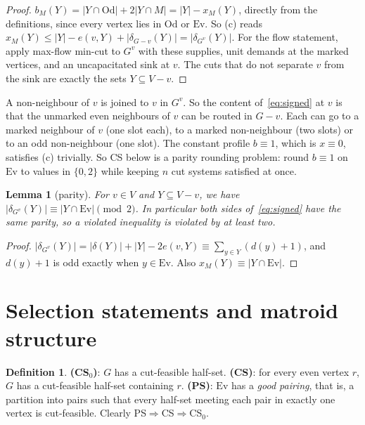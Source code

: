 \documentclass[11pt]{amsart}
\newtheorem{lemma}[theorem]{Lemma}
\theoremstyle{definition}
\newtheorem{definition}[theorem]{Definition}
\newcommand{\Ev}{\mathrm{Ev}}
\newcommand{\Od}{\mathrm{Od}}
\begin{document}
\begin{proof}
$b_M(Y)=|Y\cap\Od|+2|Y\cap M|=|Y|-x_M(Y)$, directly from the definitions, since every vertex lies
in $\Od$ or $\Ev$. So (c) reads
$x_M(Y)\le |Y|-e(v,Y)+|\delta_{G-v}(Y)|=|\delta_{G^v}(Y)|$. For the flow statement, apply max-flow
min-cut to $G^v$ with these supplies, unit demands at the marked vertices, and an uncapacitated sink
at $v$. The cuts that do not separate $v$ from the sink are exactly the sets $Y\subseteq V-v$.
\end{proof}

A non-neighbour of $v$ is joined to $v$ in $G^v$. So the content of~\eqref{eq:signed} at $v$ is that
the unmarked even neighbours of $v$ can be routed in $G-v$. Each can go to a marked neighbour of $v$
(one slot each), to a marked non-neighbour (two slots) or to an odd non-neighbour (one slot). The
constant profile $b\equiv 1$, which is $x\equiv 0$, satisfies (c) trivially. So CS below is a parity
rounding problem: round $b\equiv1$ on $\Ev$ to values in $\{0,2\}$ while keeping $n$ cut systems
satisfied at once.

\begin{lemma}[parity]\label{lem:parity}
For $v\in V$ and $Y\subseteq V-v$, we have $|\delta_{G^v}(Y)|\equiv |Y\cap\Ev|\pmod 2$. In particular
both sides of~\eqref{eq:signed} have the same parity, so a violated inequality is violated by at
least two.
\end{lemma}

\begin{proof}
$|\delta_{G^v}(Y)|=|\delta(Y)|+|Y|-2e(v,Y)\equiv\sum_{y\in Y}(d(y)+1)$, and $d(y)+1$ is odd exactly
when $y\in\Ev$. Also $x_M(Y)\equiv|Y\cap\Ev|$.
\end{proof}

\section{Selection statements and matroid structure}\label{sec:consequences}

\begin{definition}
\textbf{(CS$_0$)}: $G$ has a cut-feasible half-set. \textbf{(CS)}: for every even vertex $r$, $G$ has a
cut-feasible half-set containing $r$. \textbf{(PS)}: $\Ev$ has a \emph{good pairing}, that is, a
partition into pairs such that every half-set meeting each pair in exactly one vertex is
cut-feasible. Clearly PS$\Rightarrow$CS$\Rightarrow$CS$_0$.
\end{definition}
\end{document}
